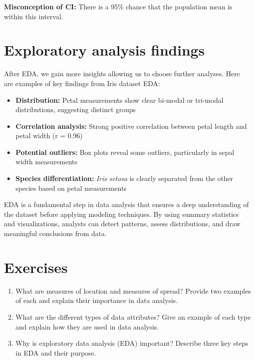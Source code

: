 \documentclass[
]{book}
\providecommand{\tightlist}{%
  \setlength{\itemsep}{0pt}\setlength{\parskip}{0pt}}
\begin{document}
\textbf{Misconception of CI:} There is a 95\% chance that the population mean is within this interval.

\section{Exploratory analysis findings}\label{exploratory-analysis-findings}

After EDA, we gain more insights allowing us to choose further analyses. Here are examples of key findings from Iris dataset EDA:

\begin{itemize}
\tightlist
\item
  \textbf{Distribution:} Petal measurements show clear bi-modal or tri-modal distributions, suggesting distinct groups
\item
  \textbf{Correlation analysis:} Strong positive correlation between petal length and petal width (r = 0.96)
\item
  \textbf{Potential outliers:} Box plots reveal some outliers, particularly in sepal width measurements
\item
  \textbf{Species differentiation:} \emph{Iris setosa} is clearly separated from the other species based on petal measurements
\end{itemize}

EDA is a fundamental step in data analysis that ensures a deep understanding of the dataset before applying modeling techniques. By using summary statistics and visualizations, analysts can detect patterns, assess distributions, and draw meaningful conclusions from data.

\section{Exercises}\label{exercises-4}

\begin{enumerate}
\def\labelenumi{\arabic{enumi}.}
\tightlist
\item
  What are measures of location and measures of spread? Provide two examples of each and explain their importance in data analysis.
\item
  What are the different types of data attributes? Give an example of each type and explain how they are used in data analysis.
\item
  Why is exploratory data analysis (EDA) important? Describe three key steps in EDA and their purpose.
\end{enumerate}
\end{document}
